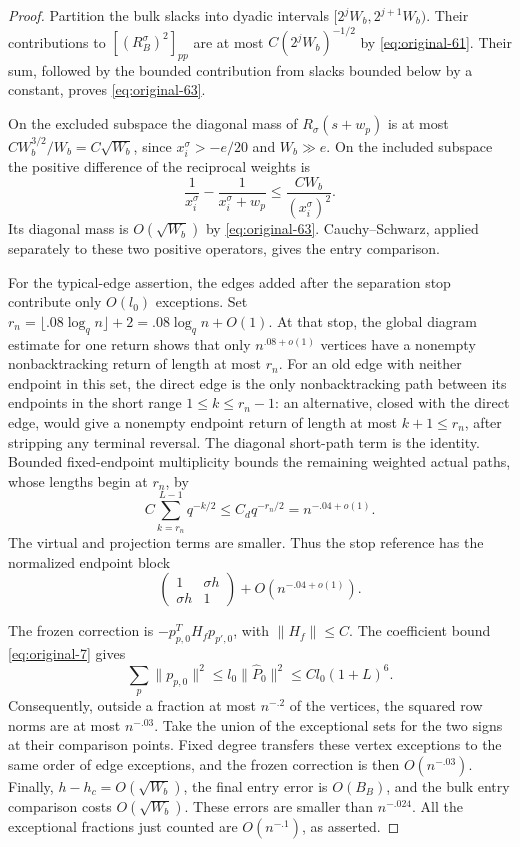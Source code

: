 \begin{proof}
Partition the bulk slacks into dyadic intervals
$[2^jW_b,2^{j+1}W_b)$.  Their contributions to
$[(R_B^\sigma)^2]_{pp}$ are at most $C(2^jW_b)^{-1/2}$ by
\eqref{eq:original-61}.  Their sum, followed by the bounded contribution from
slacks bounded below by a constant, proves \eqref{eq:original-63}.

On the excluded subspace the diagonal mass of $R_\sigma(s+w_p)$ is at most
$CW_b^{3/2}/W_b=C\sqrt{W_b}$, since $x_i^\sigma>-e/20$ and $W_b\gg e$.
On the included subspace the positive difference of the reciprocal weights is
\[
 \frac1{x_i^\sigma}-\frac1{x_i^\sigma+w_p}
 \le \frac{CW_b}{(x_i^\sigma)^2}.
\]
Its diagonal mass is $O(\sqrt{W_b})$ by \eqref{eq:original-63}.
Cauchy--Schwarz, applied separately to these two positive operators, gives the
entry comparison.

For the typical-edge assertion, the edges added after the separation stop
contribute only $O(l_0)$ exceptions.  Set
$r_n=\lfloor .08\log_q n\rfloor+2=.08\log_q n+O(1)$.
At that stop, the global diagram estimate for one return shows that only
$n^{.08+o(1)}$ vertices have a nonempty nonbacktracking return of length at most
$r_n$.  For an old edge with neither endpoint in this set, the direct edge is
the only nonbacktracking path between its endpoints in the short range
$1\le k\le r_n-1$: an alternative, closed with the direct edge, would give a
nonempty endpoint return of length at most $k+1\le r_n$, after stripping any
terminal reversal.  The diagonal short-path term is the identity.
Bounded fixed-endpoint multiplicity bounds the remaining weighted actual
paths, whose lengths begin at $r_n$, by
\[
 C\sum_{k=r_n}^{L-1}q^{-k/2}
 \le C_dq^{-r_n/2}=n^{-.04+o(1)}.
\]
The virtual and projection terms are smaller.  Thus the stop reference has
the normalized endpoint block
\[
 \begin{pmatrix}1&\sigma h\\ \sigma h&1\end{pmatrix}
 +O(n^{-.04+o(1)}).
\]

The frozen correction is $-p_{p,0}^TH_fp_{p',0}$, with $\|H_f\|\le C$.
The coefficient bound \eqref{eq:original-7} gives
\[
 \sum_p\|p_{p,0}\|^2
 \le l_0\|\widehat P_0\|^2
 \le Cl_0(1+L)^6.
\]
Consequently, outside a fraction at most $n^{-.2}$ of the vertices, the squared
row norms are at most $n^{-.03}$.  Take the union of the exceptional sets for
the two signs at their comparison points.  Fixed degree transfers these
vertex exceptions to the same order of edge exceptions, and the frozen
correction is then $O(n^{-.03})$.  Finally,
$h-h_c=O(\sqrt{W_b})$, the final entry error is $O(B_B)$, and the bulk entry
comparison costs $O(\sqrt{W_b})$.  These errors are smaller than
$n^{-.024}$.  All the exceptional fractions just counted are
$O(n^{-.1})$, as asserted.
\end{proof}

